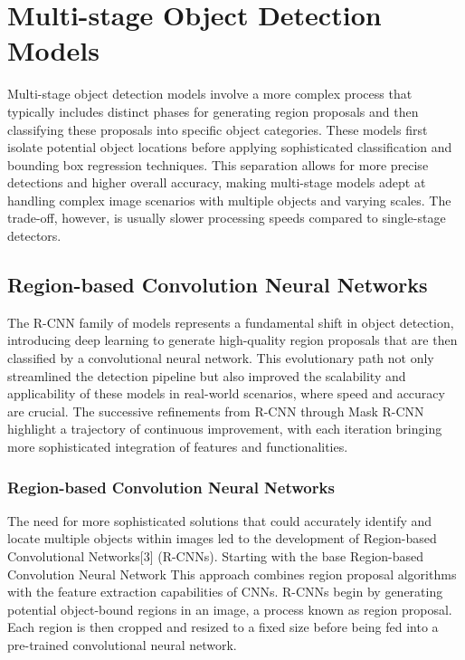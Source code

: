 \section{Multi-stage Object Detection Models}

Multi-stage object detection models involve a more complex process that typically includes distinct phases for generating region proposals and then classifying 
these proposals into specific object categories. These models first isolate potential object locations before applying sophisticated classification and 
bounding box regression techniques. This separation allows for more precise detections and higher overall accuracy, making multi-stage models adept at 
handling complex image scenarios with multiple objects and varying scales. The trade-off, however, is usually slower processing speeds compared to 
single-stage detectors.

\subsection{Region-based Convolution Neural Networks}

The R-CNN family of models represents a fundamental shift in object detection, introducing deep learning to generate high-quality region proposals 
that are then classified by a convolutional neural network. This evolutionary path not only streamlined the detection pipeline but also improved the 
scalability and applicability of these models in real-world scenarios, where speed and accuracy are crucial. The successive refinements from R-CNN 
through Mask R-CNN highlight a trajectory of continuous improvement, with  each iteration bringing more sophisticated integration of features and functionalities.


\newpage
\subsubsection{Region-based Convolution Neural Networks}

The need for more sophisticated solutions that could accurately identify and locate multiple objects within images led to the development of 
Region-based Convolutional Networks[3] (R-CNNs). Starting with the base Region-based Convolution Neural Network This approach combines region proposal 
algorithms with the feature extraction capabilities of CNNs. R-CNNs begin by generating potential object-bound regions in an image, a process known 
as region proposal. Each region is then cropped and resized to a fixed size before being fed into a pre-trained convolutional neural network. 

